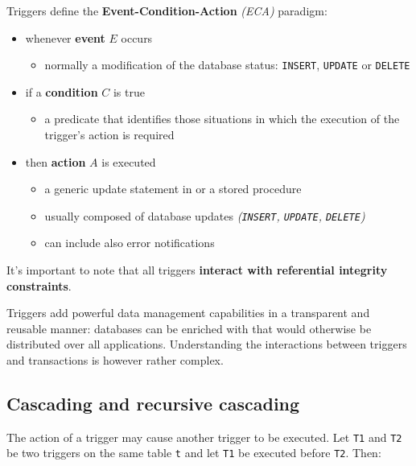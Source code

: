 \documentclass[english]{article}
\begin{document}
Triggers define the \textbf{Event-Condition-Action} \textit{(ECA)} paradigm:

\begin{itemize}
  \item whenever \textbf{event} \(E\) occurs
        \begin{itemize}[label=\(\rightarrow\)]
          \item normally a modification of the database status: \texttt{INSERT}, \texttt{UPDATE} or \texttt{DELETE}
        \end{itemize}
  \item if a \textbf{condition} \(C\) is true
        \begin{itemize}
          \item a predicate that identifies those situations in which the execution of the trigger's action is required
        \end{itemize}
  \item then \textbf{action} \(A\) is executed
        \begin{itemize}[label=\(\rightarrow\)]
          \item a generic update statement in or a stored procedure
          \item usually composed of database updates \textit{(\texttt{INSERT}, \texttt{UPDATE}, \texttt{DELETE})}
          \item can include also error notifications
        \end{itemize}
\end{itemize}

It's important to note that all triggers \textbf{interact with referential integrity constraints}.

\bigskip
Triggers add powerful data management capabilities in a transparent and reusable manner:
databases can be enriched with  that would otherwise be distributed over all applications.
Understanding the interactions between triggers and transactions is however rather complex.

\subsection{Cascading and recursive cascading}

The action of a trigger may cause another trigger to be executed.
Let \texttt{T1} and \texttt{T2} be two triggers on the same table \texttt{t} and let \texttt{T1} be executed before \texttt{T2}.
Then:
\end{document}
